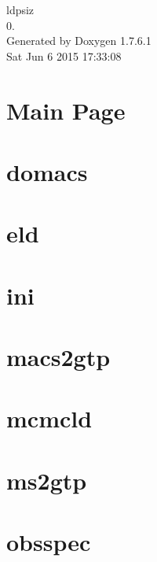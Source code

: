 \documentclass[letterpaper]{article}
\begin{document}
\hypersetup{pageanchor=false,citecolor=blue}
\begin{titlepage}
\vspace*{7cm}
\begin{center}
{\Large ldpsiz \\[1ex]\large 0. }\\
\vspace*{1cm}
{\large \-Generated by Doxygen 1.7.6.1}\\
\vspace*{0.5cm}
{\small Sat Jun 6 2015 17:33:08}\\
\end{center}
\end{titlepage}
\tableofcontents
{}
\hypersetup{pageanchor=true,citecolor=blue}
\section{\-Main \-Page}
\label{index}\hypertarget{index}{}
\section{domacs}
\label{domacs}
\hypertarget{domacs}{}

\section{eld}
\label{eld}
\hypertarget{eld}{}

\section{ini}
\label{ini}
\hypertarget{ini}{}

\section{macs2gtp}
\label{macs2gtp}
\hypertarget{macs2gtp}{}

\section{mcmcld}
\label{mcmcld}
\hypertarget{mcmcld}{}

\section{ms2gtp}
\label{ms2gtp}
\hypertarget{ms2gtp}{}

\section{obsspec}
\label{obsspec}
\hypertarget{obsspec}{}

\end{document}
